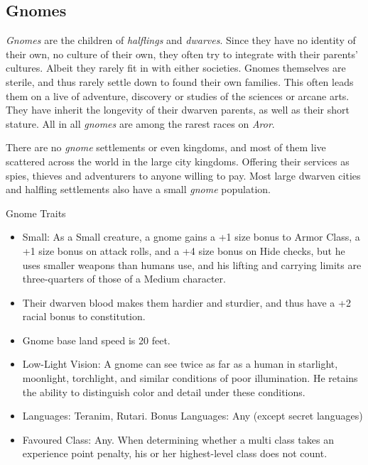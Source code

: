 \subsection{Gnomes}
\label{sec:Gnomes}

\emph{Gnomes} are the children of \emph{halflings} and \emph{dwarves}. Since
they have no identity of their own, no culture of their own, they often try to
integrate with their parents' cultures. Albeit they rarely fit in with either
societies. Gnomes themselves are sterile, and thus rarely settle down to found
their own families. This often leads them on a live of adventure, discovery or
studies of the sciences or arcane arts. They have inherit the longevity of
their dwarven parents, as well as their short stature. All in all \emph{gnomes}
are among the rarest races on \emph{Aror}.

There are no \emph{gnome} settlements or even kingdoms, and most of them live
scattered across the world in the large city kingdoms. Offering their services
as spies, thieves and adventurers to anyone willing to pay. Most large dwarven
cities and halfling settlements also have a small \emph{gnome} population.

\begin{35e}{Gnome Traits}
  \begin{itemize}[noitemsep]
    \item Small: As a Small creature, a gnome gains a +1 size bonus to Armor
    Class, a +1 size bonus on attack rolls, and a +4 size bonus on Hide
    checks, but he uses smaller weapons than humans use, and his lifting and
    carrying limits are three-quarters of those of a Medium character.
    \item Their dwarven blood makes them hardier and sturdier, and thus have
      a +2 racial bonus to constitution.
    \item Gnome base land speed is 20 feet.
    \item Low-Light Vision: A gnome can see twice as far as a human in
    starlight, moonlight, torchlight, and similar conditions of poor
    illumination. He retains the ability to distinguish color and detail under
    these conditions.
    \item Languages: Teranim, Rutari. Bonus Languages: Any (except secret
       languages)
    \item Favoured Class: Any. When determining whether a multi class takes an
    experience point penalty, his or her highest-level class does not count.
  \end{itemize}
\end{35e}
